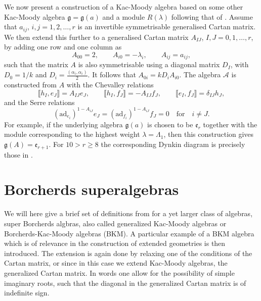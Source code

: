 We now present a construction of a Kac-Moody algebra based on some other Kac-Moody algebra $\mathfrak{g}=\mathfrak{g}(a)$ and a module $R(\lambda)$ following that of \cite{CederwallPalmkvist2017}. Assume that $a_{ij}$, $i,j=1,2,\ldots,r$ is an invertible symmetrisable generalised Cartan matrix. We then extend this further to a generalised Cartan matrix $A_{IJ}$, $I,J=0,1,\ldots,r$, by adding one row and one column as 
\begin{equation}
    A_{00}=2,\qquad A_{i0} = -\lambda_i,\qquad A_{ij} = a_{ij},
\end{equation}
such that the matrix $A$ is also symmetrisable using a diagonal matrix $D_I$, with $D_0=1/k$ and $D_i = \frac{(\alpha_i,\alpha_i)}{2}$. It follows that $A_{0i}=kD_iA_{i0}$. The algebra $\mathscr{A}$ is constructed from $A$ with the Chevalley relations 
\begin{equation}
    \llbracket h_I,e_J\rrbracket = A_{IJ}e_J,\qquad \llbracket h_I,f_J\rrbracket = -A_{IJ}f_J,\qquad \llbracket e_I,f_J\rrbracket = \delta_{IJ}h_J,
\end{equation}
and the Serre relations 
\begin{equation}
    (\text{ad}_{e_i})^{1-A_{iJ}}e_J = (\text{ad}_{f_i})^{1-A_{iJ}}f_J = 0 \quad \text{for} \quad i\neq J.
\end{equation}
For example, if the underlying algebra $\mathfrak{g}(a)$ is chosen to be $\mathfrak{e}_r$ together with the module corresponding to the highest weight $\lambda =\Lambda_1$, then this construction gives $\mathfrak{g}(A)=\mathfrak{e}_{r+1}$. For $10>r\geq 8$ the corresponding Dynkin diagram is precisely those in . 

\section{Borcherds superalgebras}\label{sec:Borcherds}

We will here give a brief set of definitions from \cite{Ray2006} for a yet larger class of algebras, super Borcherds algbras, also called generalized Kac-Moody algebras or Borcherds-Kac-Moody algebras (BKM). A particular example of a BKM algebra which is of relevance in the construction of extended geometries is then introduced. The extension is again done by relaxing one of the conditions of the Cartan matrix, or since in this case we extend Kac-Moody algebras, the generalized Cartan matrix. In words one allow for the possibility of simple imaginary roots, such that the diagonal in the generalized Cartan matrix is of indefinite sign.

